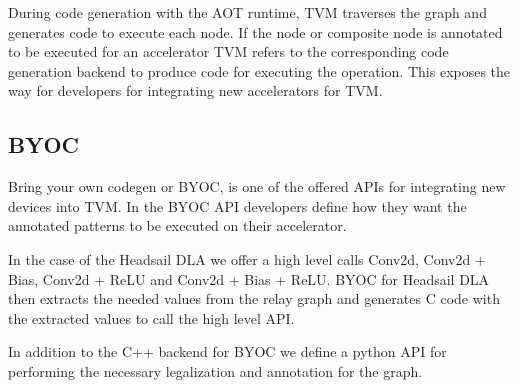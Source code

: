 \documentclass[12pt,a4paper,english
]{tunithesis}
\begin{document}
During code generation with the AOT runtime, TVM traverses the graph and generates code to execute each node. If the node or composite node is annotated to be executed for an accelerator TVM refers to the corresponding code generation backend to produce code for executing the operation. This exposes the way for developers for integrating new accelerators for TVM.

\subsection{BYOC}
Bring your own codegen or BYOC, is one of the offered APIs for integrating new devices into TVM. In the BYOC API developers define how they want the annotated patterns to be executed on their accelerator.

In the case of the Headsail DLA we offer a high level calls Conv2d, Conv2d + Bias, Conv2d + ReLU and Conv2d + Bias + ReLU. BYOC for Headsail DLA then extracts the needed values from the relay graph and generates C code with the extracted values to call the high level API.

In addition to the C++ backend for BYOC we define a python API for performing the necessary legalization and annotation for the graph.
\end{document}
